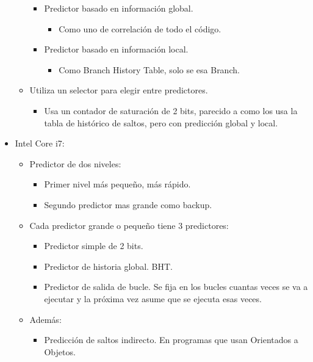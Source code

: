 \documentclass[12pt, twoside, openright]{report} %
\begin{document}
\begin{itemize}
\begin{itemize}
      \begin{itemize}
      
      \item
        Predictor basado en información global.

        \begin{itemize}
        
        \item
          Como uno de correlación de todo el código.
        \end{itemize}
      \item
        Predictor basado en información local.

        \begin{itemize}
        
        \item
          Como Branch History Table, solo se esa Branch.
        \end{itemize}
      \end{itemize}
    \item
      Utiliza un selector para elegir entre predictores.

      \begin{itemize}
      
      \item
        Usa un contador de saturación de 2 bits, parecido a como los usa
        la tabla de histórico de saltos, pero con predicción global y
        local.
      \end{itemize}
    \end{itemize}
  \item Intel Core i7:

    \begin{itemize}
    
    \item
      Predictor de dos niveles:

      \begin{itemize}
      
      \item
        Primer nivel más pequeño, más rápido.
      \item
        Segundo predictor mas grande como backup.
      \end{itemize}
    \item
      Cada predictor grande o pequeño tiene 3 predictores:

      \begin{itemize}
      
      \item
        Predictor simple de 2 bits.
      \item
        Predictor de historia global. BHT.
      \item
        Predictor de salida de bucle. Se fija en los bucles cuantas
        veces se va a ejecutar y la próxima vez asume que se ejecuta
        esas veces.
      \end{itemize}
    \item
      Además:
      \begin{itemize}
        \item Predicción de saltos indirecto. En programas que usan Orientados a
          Objetos.
  

\end{itemize}
\end{itemize}
\end{itemize}
\end{document}
